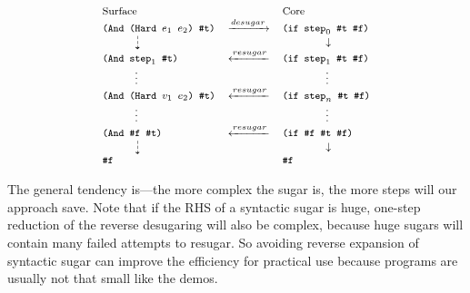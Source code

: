 \[
{\footnotesize
	\begin{array}{lcl}
	\text{Surface}&&\text{Core}\\
	\Code{(And (Hard $e_1$ $e_2$) \#t)}&\xrightarrow{desugar}&\Code{(if $\m{step}_0$ \#t \#f)}\\
	\qquad\quad\dashdownarrow& &\qquad\qquad\downarrow\\
	\Code{(And $\m{step}_1$ \#t)}&\xleftarrow{resugar}&\Code{(if $\m{step}_1$ \#t \#f)}\\
	\qquad\quad\vdots& &\qquad\qquad\vdots\\
	\Code{(And (Hard $v_1$ $e_2$) \#t)}&\xleftarrow{resugar}&\Code{(if $\m{step}_n$ \#t \#f)}\\
	\qquad\quad\vdots& &\qquad\qquad\vdots\\
	\Code{(And \#f \#t)}&\xleftarrow{resugar}& \Code{(if \#f \#t \#f)}\\
	\qquad\quad\dashdownarrow& &\qquad\qquad\downarrow\\
	\Code{\#f}&& \Code{\#f}\\
\end{array}
}
\]


The general tendency is---the more complex the sugar is, the more steps will our approach save. Note that if the RHS of a syntactic sugar is huge, one-step reduction of the reverse desugaring will also be complex, because huge sugars will contain many failed attempts to resugar. So avoiding reverse expansion of syntactic sugar can improve the efficiency for practical use because programs are usually not that small like the demos.
